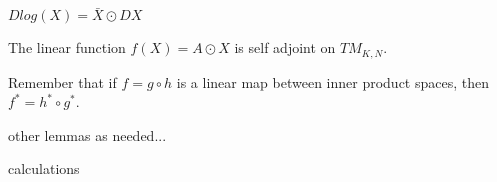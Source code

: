 \begin{lemm}
$Dlog(X)=\bar{X}\odot DX$
\end{lemm}

\begin{lemm}
The linear function $f(X)=A\odot X$ is self adjoint on $TM_{K,N}$.
\end{lemm}

Remember that if $f=g\circ h$ is a linear map between inner product spaces, then $f^{*}=h^{*}\circ g^{*}$.

other lemmas as needed...

calculations





